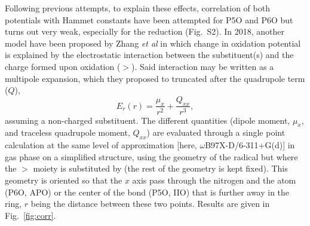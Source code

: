 \documentclass[review]{elsarticle}
\begin{document}
Following previous attempts, to explain these effects, correlation of both potentials with Hammet constants have been attempted for P5O and P6O but turns out very weak, especially for the reduction (Fig.~S2). In 2018, another model have been proposed by Zhang \textit{et al} \cite{zhangEffectHeteroatomFunctionality2018} in which change in oxidation potential is explained by the electrostatic interaction between the substituent(s) and the charge formed upon oxidation ($>$). Said interaction may be written as a  multipole expansion, which they proposed to truncated after the quadrupole term ($Q$),\begin{equation*}
	E_r(r) = \frac{\mu_x}{r^2} + \frac{Q_{xx}}{r^3},
\end{equation*}
assuming a non-charged substituent. The different quantities (dipole moment, $\mu_x$, and traceless quadrupole moment, $Q_{xx}$) are evaluated through a single point calculation at the same level of approximation [here, $\omega$B97X-D/6-311+G(d)] in gas phase on a simplified structure, using the geometry of the radical but where the $>$ moiety is substituted by  (the rest of the geometry is kept fixed). This geometry is oriented so that the $x$ axis pass through the nitrogen and the atom (P6O, APO) or the center of the bond (P5O, IIO) that is further away in the ring, $r$ being the distance between these two points. Results are given in Fig.~\ref{fig:corr}. 
\end{document}
